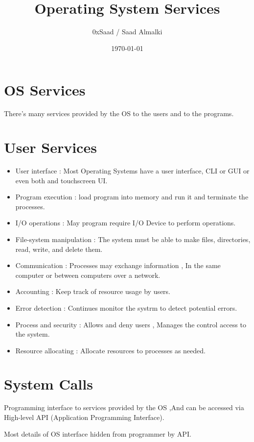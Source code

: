 \documentclass[12pt]{article}
\title{Operating System Services}
\author{0xSaad / Saad Almalki}
\date{\today}
\begin{document}
\maketitle

\section{OS Services}
There's many services provided by the OS to the users and to the programs.
\section{User Services}
\begin{itemize}


    \item User interface : Most Operating Systems have a user interface, CLI or GUI or even both and touchscreen UI.
    \item Program execution : load program into memory and run it and terminate the processes.
    \item I/O operations : May program require I/O Device to perform operations.
    \item File-system manipulation : The system must be able to make files, directories, read, write, and delete them.
    \item Communication : Processes may exchange information , In the same computer or between computers over a network.
    \item Accounting : Keep track of resource usage by users.
    \item Error detection : Continues monitor the systrm to detect potential errors.
    \item Process and security : Allows and deny users , Manages the control access to the system.
    \item Resource allocating : Allocate resources to processes as needed.
\end{itemize}

\section{System Calls}
Programming interface to services provided by the OS ,And can be accessed via High-level API (Application Programming Interface).

Most details of OS interface hidden from programmer by API.
\end{document}
